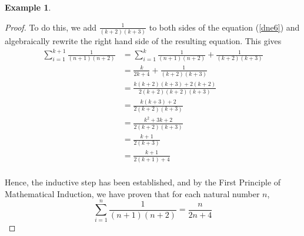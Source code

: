 \documentclass{book}
\theoremstyle{definition}
\newtheorem{example}{Example}[definition]
\theoremstyle{remark}
\begin{document}
\begin{example}
\begin{proof}
        To do this, we add $\frac{1}{(k+2)(k+3)}$ to both sides of the equation (\ref{dne6}) and algebraically rewrite the right hand side of the resulting equation. This gives
            \begin{align*}
                \sum_{i=1}^{k+1}{\frac{1}{(n+1)(n+2)}} & = \sum_{i=1}^{k}{\frac{1}{(n+1)(n+2)}} + \frac{1}{(k+2)(k+3)} \\
                    & = \frac{k}{2k + 4} + \frac{1}{(k+2)(k+3)} \\
                    & = \frac{k(k+2)(k+3) + 2(k+2)}{2(k+2)(k+2)(k+3)} \\
                    & = \frac{k(k+3)+2}{2(k+2)(k+3)} \\
                    & = \frac{k^2 +3k + 2}{2(k+2)(k+3)} \\
                    & = \frac{k+1}{2(k+3)} \\
                    & = \frac{k+1}{2(k+1) + 4 }\\
            \end{align*}
        
        Hence, the inductive step has been established, and by the First Principle of Mathematical Induction, we have proven that for each natural number $n$,
            \begin{equation*}
                \sum_{i=1}^{n}{\frac{1}{(n+1)(n+2)}} = \frac{n}{2n +4}
            \end{equation*}
    \end{proof}
\end{example}
\end{document}
